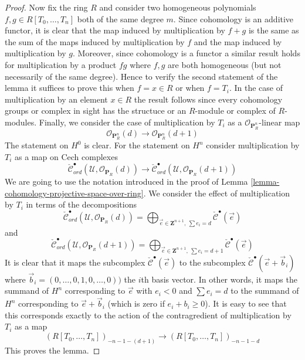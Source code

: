 \begin{proof}
\medskip\noindent
Now fix the ring $R$ and consider two homogeneous polynomials
$f, g \in R[T_0, \ldots, T_n]$ both of the same degree $m$.
Since cohomology is an additive functor, it is clear that the
map induced by multiplication by $f + g$ is the same as the sum
of the maps induced by multiplication by $f$ and the map induced
by multiplication by $g$. Moreover, since cohomology is a functor
a similar result holds for multiplication by a product $fg$ where
$f, g$ are both homogeneous (but not necessarily of the same degree).
Hence to verify the second statement of the lemma it suffices to
prove this when $f = x \in R$ or when $f = T_i$.
In the case of multiplication by an element $x \in R$ the result
follows since every cohomology groups or complex in sight has the
structuce or an $R$-module or complex of $R$-modules.
Finally, we consider the case of multiplication by $T_i$
as a $\mathcal{O}_{\mathbf{P}^n_R}$-linear map 
$$
\mathcal{O}_{\mathbf{P}^n_R}(d)
\longrightarrow
\mathcal{O}_{\mathbf{P}^n_R}(d + 1)
$$
The statement on $H^0$ is clear. For the statement on $H^n$ 
consider multiplication by $T_i$ as a map on Cech complexes
$$
\check{\mathcal{C}}_{ord}^\bullet(\mathcal{U},
\mathcal{O}_{\mathbf{P}_R}(d))
\longrightarrow
\check{\mathcal{C}}_{ord}^\bullet(\mathcal{U},
\mathcal{O}_{\mathbf{P}_{R}}(d + 1))
$$
We are going to use the notation introduced in the proof of
Lemma \ref{lemma-cohomology-projective-space-over-ring}.
We consider the effect of multiplication by $T_i$
in terms of the decompositions
$$
\check{\mathcal{C}}_{ord}^\bullet(\mathcal{U}, \mathcal{O}_{\mathbf{P}_R}(d))
=
\bigoplus\nolimits_{\vec{e} \in \mathbf{Z}^{n + 1},\ \sum e_i = d}
\check{\mathcal{C}}^\bullet(\vec{e})
$$
and
$$
\check{\mathcal{C}}_{ord}^\bullet(\mathcal{U},
\mathcal{O}_{\mathbf{P}_R}(d + 1))
=
\bigoplus\nolimits_{\vec{e} \in \mathbf{Z}^{n + 1},\ \sum e_i = d + 1}
\check{\mathcal{C}}^\bullet(\vec{e})
$$
It is clear that it maps the subcomplex
$\check{\mathcal{C}}^\bullet(\vec{e})$ to the subcomplex
$\check{\mathcal{C}}^\bullet(\vec{e} + \vec{b}_i)$ where
$\vec{b}_i = (0, \ldots, 0, 1, 0, \ldots, 0))$ the $i$th basis vector.
In other words, it maps the summand of $H^n$ corresponding to
$\vec{e}$ with $e_i < 0$ and $\sum e_i = d$
to the summand of $H^n$ corresponding to
$\vec{e} + \vec{b}_i$ (which is zero if $e_i + b_i \geq 0$).
It is easy to see that this corresponds exactly to the action
of the contragredient of multiplication by $T_i$ as a map
$$
(R[T_0, \ldots, T_n])_{-n - 1 - (d + 1)}
\longrightarrow
(R[T_0, \ldots, T_n])_{-n - 1 - d}
$$
This proves the lemma.
\end{proof}

